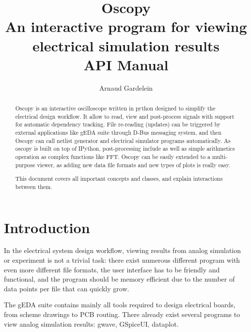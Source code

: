 \documentclass[a4paper,11pt]{article}
\title{{\sc Oscopy}\\An interactive program for viewing electrical simulation results\\API Manual}
\author{Arnaud Gardelein}
\begin{document}
\maketitle
\begin{abstract}

Oscopy is an interactive oscilloscope written in python designed to simplify the electrical design workflow.
It allow to read, view and post-process signals with support for automatic dependency tracking.
File re-reading (updates) can be triggered by external applications like gEDA suite through D-Bus messaging system, and then Oscopy can call netlist generator and electrical simulator programs automatically.
As oscopy is built on top of IPython, post-processing include as well as simple arithmetics operation as complex functions like FFT.
Oscopy can be easily extended to a multi-purpose viewer, as adding new data file formats and new types of plots is really easy.


This document covers all important concepts and classes, and explain interactions between them.
\end{abstract}

\section{Introduction}
\label{sec:intro}
In the electrical system design workflow, viewing results from analog simulation or experi\-ment is not a trivial task: there exist numerous different program with even more different file formats, the user interface has to be friendly and functional, and the program should be memory efficient due to the number of data points per file that can quickly grow.

The gEDA suite contains mainly all tools required to design electrical boards, from scheme drawings to PCB routing.
There already exist several programs to view analog simulation results: gwave, GSpiceUI, dataplot.
\end{document}
